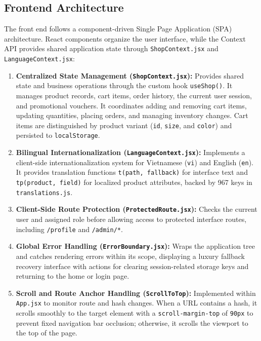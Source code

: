\documentclass[12pt,a4paper,oneside]{report}
\begin{document}
\subsection{Frontend Architecture}
The front end follows a component-driven Single Page Application (SPA) architecture. React components organize the user interface, while the Context API provides shared application state through \texttt{ShopContext.jsx} and \texttt{LanguageContext.jsx}:
\begin{enumerate}[leftmargin=1.2cm]
    \item \textbf{Centralized State Management (\texttt{ShopContext.jsx}):} Provides shared state and business operations through the custom hook \texttt{useShop()}. It manages product records, cart items, order history, the current user session, and promotional vouchers. It coordinates adding and removing cart items, updating quantities, placing orders, and managing inventory changes. Cart items are distinguished by product variant (\texttt{id}, \texttt{size}, and \texttt{color}) and persisted to \texttt{localStorage}.
    \item \textbf{Bilingual Internationalization (\texttt{LanguageContext.jsx}):} Implements a client-side internationalization system for Vietnamese (\texttt{vi}) and English (\texttt{en}). It provides translation functions \texttt{t(path, fallback)} for interface text and \texttt{tp(product, field)} for localized product attributes, backed by 967 keys in \texttt{translations.js}.
    \item \textbf{Client-Side Route Protection (\texttt{ProtectedRoute.jsx}):} Checks the current user and assigned role before allowing access to protected interface routes, including \texttt{/profile} and \texttt{/admin/*}.
    \item \textbf{Global Error Handling (\texttt{ErrorBoundary.jsx}):} Wraps the application tree and catches rendering errors within its scope, displaying a luxury fallback recovery interface with actions for clearing session-related storage keys and returning to the home or login page.
    \item \textbf{Scroll and Route Anchor Handling (\texttt{ScrollToTop}):} Implemented within \texttt{App.jsx} to monitor route and hash changes. When a URL contains a hash, it scrolls smoothly to the target element with a \texttt{scroll-margin-top} of \texttt{90px} to prevent fixed navigation bar occlusion; otherwise, it scrolls the viewport to the top of the page.
\end{enumerate}
\end{document}
